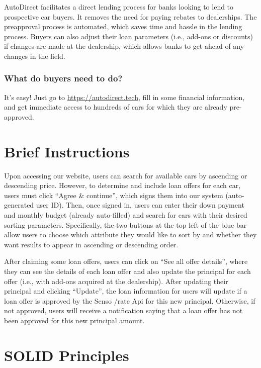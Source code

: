 \documentclass[fontsize=14pt]{article}
\begin{document}
AutoDirect facilitates a direct lending process for banks looking to lend to prospective car buyers. It removes the need for paying rebates to dealerships. The preapproval process is automated, which saves time and hassle in the lending process. Buyers can also adjust their loan parameters (i.e., add-ons or discounts) if changes are made at the dealership, which allows banks to get ahead of any changes in the field. 

\subsubsection*{\large What do buyers need to do?}

It's easy! Just go to {\color{blue} \href{https://autodirect.tech}{https://autodirect.tech}}, fill in some financial information, and get immediate access to hundreds of cars for which they are already pre-approved.

\section*{Brief Instructions}
Upon accessing our website, users can search for available cars by ascending or descending price. However, to determine and include loan offers for each car, users must click ``Agree \& continue'', which signs them into our system (auto-generated user ID). Then, once signed in, users can enter their down payment and monthly budget (already auto-filled) and search for cars with their desired sorting parameters. Specifically, the two buttons at the top left of the blue bar allow users to choose which attribute they would like to sort by and whether they want results to appear in ascending or descending order.

After claiming some loan offers, users can click on ``See all offer details'', where they can see the details of each loan offer and also update the principal for each offer (i.e., with add-ons acquired at the dealership). After updating their principal and clicking ``Update'', the loan information for users will update if a loan offer is approved by the Senso /rate Api for this new principal. Otherwise, if not approved, users will receive a notification saying that a loan offer has not been approved for this new principal amount. 

\section*{SOLID Principles} 
\end{document}
